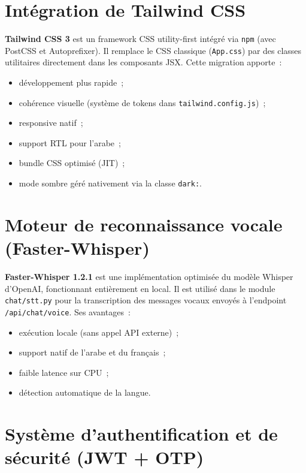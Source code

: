 \documentclass[12pt,a4paper]{report}
\begin{document}
\section{Intégration de Tailwind CSS}
\label{sec:tailwind}

\textbf{Tailwind CSS 3} est un framework CSS utility-first intégré via \texttt{npm} (avec PostCSS et Autoprefixer). Il remplace le CSS classique (\texttt{App.css}) par des classes utilitaires directement dans les composants JSX. Cette migration apporte~:

\begin{itemize}[label=\textbullet]
    \item développement plus rapide~;
    \item cohérence visuelle (système de tokens dans \texttt{tailwind.config.js})~;
    \item responsive natif~;
    \item support RTL pour l'arabe~;
    \item bundle CSS optimisé (JIT)~;
    \item mode sombre géré nativement via la classe \texttt{dark:}.
\end{itemize}

\section{Moteur de reconnaissance vocale (Faster-Whisper)}
\label{sec:whisper}

\textbf{Faster-Whisper 1.2.1} est une implémentation optimisée du modèle Whisper d'OpenAI, fonctionnant entièrement en local. Il est utilisé dans le module \texttt{chat/stt.py} pour la transcription des messages vocaux envoyés à l'endpoint \texttt{/api/chat/voice}. Ses avantages~:

\begin{itemize}[label=\textbullet]
    \item exécution locale (sans appel API externe)~;
    \item support natif de l'arabe et du français~;
    \item faible latence sur CPU~;
    \item détection automatique de la langue.
\end{itemize}

\section{Système d'authentification et de sécurité (JWT + OTP)}
\label{sec:auth}
\end{document}
